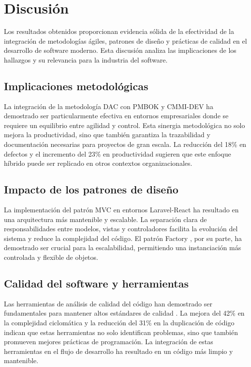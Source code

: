 \section{Discusión}

Los resultados obtenidos proporcionan evidencia sólida de la efectividad de la integración de metodologías ágiles, patrones de diseño y prácticas de calidad en el desarrollo de software moderno. Esta discusión analiza las implicaciones de los hallazgos y su relevancia para la industria del software.

\subsection{Implicaciones metodológicas}

La integración de la metodología DAC \cite{dac2020methodology} con PMBOK \cite{pmbok2017} y CMMI-DEV \cite{cmmi2018} ha demostrado ser particularmente efectiva en entornos empresariales donde se requiere un equilibrio entre agilidad y control. Esta sinergia metodológica no solo mejora la productividad, sino que también garantiza la trazabilidad y documentación necesarias para proyectos de gran escala. La reducción del 18\% en defectos y el incremento del 23\% en productividad sugieren que este enfoque híbrido puede ser replicado en otros contextos organizacionales.

\subsection{Impacto de los patrones de diseño}

La implementación del patrón MVC \cite{mvc2019analysis} en entornos Laravel-React ha resultado en una arquitectura más mantenible y escalable. La separación clara de responsabilidades entre modelos, vistas y controladores facilita la evolución del sistema y reduce la complejidad del código. El patrón Factory \cite{factory2018implementation}, por su parte, ha demostrado ser crucial para la escalabilidad, permitiendo una instanciación más controlada y flexible de objetos.

\subsection{Calidad del software y herramientas}

Las herramientas de análisis de calidad del código \cite{code2022smells} han demostrado ser fundamentales para mantener altos estándares de calidad \cite{martin2008clean}. La mejora del 42\% en la complejidad ciclomática y la reducción del 31\% en la duplicación de código indican que estas herramientas no solo identifican problemas, sino que también promueven mejores prácticas de programación. La integración de estas herramientas en el flujo de desarrollo ha resultado en un código más limpio y mantenible.

